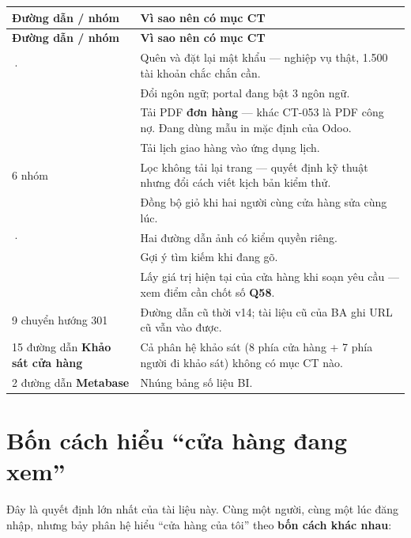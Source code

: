 {\footnotesize
\begin{longtable}{@{}L{5.6cm}L{9.4cm}@{}}
\textbf{Đường dẫn / nhóm} & \textbf{Vì sao nên có mục CT}\\ \midrule \endfirsthead
{}\textbf{Đường dẫn / nhóm} & \textbf{Vì sao nên có mục CT}\\ \midrule \endhead
{} ·  & Quên và đặt lại mật khẩu --- nghiệp vụ thật, 1.500 tài khoản chắc chắn cần. \\
 & Đổi ngôn ngữ; portal đang bật 3 ngôn ngữ. \\
 & Tải PDF \textbf{đơn hàng} --- khác CT-053 là PDF công nợ. Đang dùng mẫu in mặc định của Odoo. \\
 & Tải lịch giao hàng vào ứng dụng lịch. \\
6 nhóm  & Lọc không tải lại trang --- quyết định kỹ thuật nhưng đổi cách viết kịch bản kiểm thử. \\
 & Đồng bộ giỏ khi hai người cùng cửa hàng sửa cùng lúc. \\
 ·  & Hai đường dẫn ảnh có kiểm quyền riêng. \\
 & Gợi ý tìm kiếm khi đang gõ. \\
 & Lấy giá trị hiện tại của cửa hàng khi soạn yêu cầu --- xem điểm cần chốt số \textbf{Q58}. \\
9 chuyển hướng 301 & Đường dẫn cũ thời v14; tài liệu cũ của BA ghi URL cũ vẫn vào được. \\
15 đường dẫn \textbf{Khảo sát cửa hàng} & Cả phân hệ khảo sát (8 phía cửa hàng + 7 phía người đi khảo sát) không có mục CT nào. \\
2 đường dẫn \textbf{Metabase} & Nhúng bảng số liệu BI. \\
\end{longtable}}

\section{Bốn cách hiểu ``cửa hàng đang xem''}
\label{sec:pham-vi}

Đây là quyết định lớn nhất của tài liệu này. Cùng một người, cùng một lúc đăng nhập, nhưng bảy
phân hệ hiểu ``cửa hàng của tôi'' theo \textbf{bốn cách khác nhau}:

